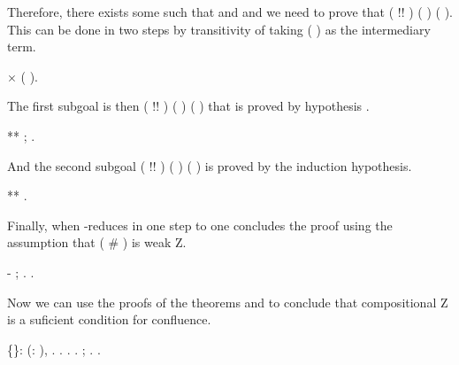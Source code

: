       Therefore, there exists some  such that    and     and we need to prove that  ( !\coqdocvar{\_}!  ) ( ) ( ). This can be done in two steps by transitivity of  taking ( ) as the intermediary term. \begin{coqdoccode}
\coqdocemptyline
\coqdocindent{3.00em}
\ensuremath{\times}    ( ).\coqdoceol
\coqdocemptyline
\end{coqdoccode}
The first subgoal is then  ( !\coqdocvar{\_}! ) ( ) ( ) that is proved by hypothesis . \begin{coqdoccode}
\coqdocemptyline
\coqdocindent{4.00em}
**  ; .\coqdoceol
\coqdocemptyline
\end{coqdoccode}
And the second subgoal  ( !\coqdocvar{\_}! ) ( ) ( ) is proved by the induction hypothesis. \begin{coqdoccode}
\coqdocemptyline
\coqdocindent{4.00em}
** .\coqdoceol
\coqdocemptyline
\end{coqdoccode}
Finally, when  -reduces in one step to  one concludes the proof using the assumption that ( \# ) is weak Z. \begin{coqdoccode}
\coqdocemptyline
\coqdocindent{1.00em}
-  ; . .\coqdoceol
\coqdocemptyline
\end{coqdoccode}
Now we can use the proofs of the theorems  and  to conclude that compositional Z is a suficient condition for confluence. \begin{coqdoccode}
\coqdocemptyline
\coqdocnoindent
{}  \{\}: \coqdockw{\ensuremath{\forall}} (:  ),     . .   .    .  ; . .\coqdoceol
\coqdocemptyline
\end{coqdoccode}
